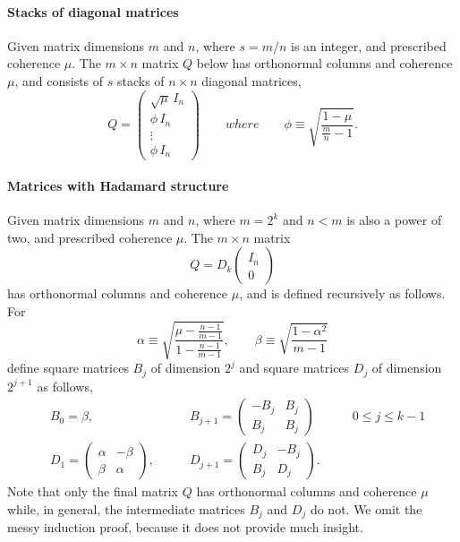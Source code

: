 \documentclass{siamltex}
\begin{document}
\paragraph{Stacks of diagonal matrices}
Given matrix dimensions $m$ and $n$, where $s=m/n$ is an integer,
and prescribed coherence $\mu$. The $m\times n$ matrix $Q$ below has
orthonormal columns and coherence $\mu$, and consists of
$s$ stacks of $n\times n$ diagonal matrices,
$$Q=
\begin{pmatrix}\sqrt{\mu}\,I_n\\ \phi\,  I_n\\ \vdots \\ \phi\, I_n\end{pmatrix}
\qquad where \qquad
\phi\equiv \sqrt{\frac{1-\mu}{\frac{m}{n}-1}}.$$

\paragraph{Matrices with Hadamard structure}
Given matrix dimensions $m$ and $n$, where $m=2^k$ and $n<m$ is also a power
of two, and prescribed coherence $\mu$. The $m \times n$ matrix
$$Q= D_k\begin{pmatrix}I_n\\0\end{pmatrix}$$
has orthonormal columns and coherence $\mu$, and is defined recursively
as follows.
For
$$\alpha\equiv\sqrt{\frac{\mu-\frac{n-1}{m-1}}{1-\frac{n-1}{m-1}}},\qquad
\beta\equiv \sqrt{\frac{1-\alpha^2}{m-1}}$$
define square matrices $B_j$ of dimension $2^j$ and square matrices $D_j$
of dimension $2^{j+1}$ as follows,
\begin{eqnarray*}
&B_0=\beta, \qquad 
&B_{j+1}=\begin{pmatrix} -B_j & B_j \\ B_j & B_j\end{pmatrix} \quad\qquad
0\leq j\leq k-1\\
&D_1=\begin{pmatrix}\alpha & -\beta \\ \beta & \alpha\end{pmatrix},\qquad
&D_{j+1}=\begin{pmatrix}D_j & -B_j \\ B_j & D_j\end{pmatrix}.
\end{eqnarray*}
Note that only the final matrix $Q$ has orthonormal columns and coherence
$\mu$ while, in general, the intermediate matrices $B_j$ and $D_j$ do not.
We omit the messy induction proof, because it does not provide much
insight.
\end{document}
